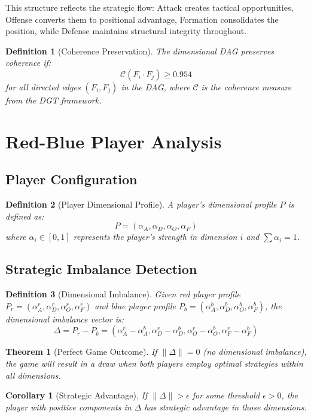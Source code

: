 \documentclass[12pt,a4paper]{article}
\newtheorem{definition}{Definition}
\newtheorem{theorem}{Theorem}
\newtheorem{corollary}{Corollary}
\begin{document}
This structure reflects the strategic flow: Attack creates tactical opportunities, Offense converts them to positional advantage, Formation consolidates the position, while Defense maintains structural integrity throughout.

\begin{definition}[Coherence Preservation]
The dimensional DAG preserves coherence if:
$$\mathcal{C}(F_i \cdot F_j) \geq 0.954$$
for all directed edges $(F_i, F_j)$ in the DAG, where $\mathcal{C}$ is the coherence measure from the DGT framework.
\end{definition}

\section{Red-Blue Player Analysis}

\subsection{Player Configuration}

\begin{definition}[Player Dimensional Profile]
A player's dimensional profile $P$ is defined as:
$$P = (\alpha_A, \alpha_D, \alpha_O, \alpha_F)$$
where $\alpha_i \in [0,1]$ represents the player's strength in dimension $i$ and $\sum \alpha_i = 1$.
\end{definition}

\subsection{Strategic Imbalance Detection}

\begin{definition}[Dimensional Imbalance]
Given red player profile $P_r = (\alpha_A^r, \alpha_D^r, \alpha_O^r, \alpha_F^r)$ and blue player profile $P_b = (\alpha_A^b, \alpha_D^b, \alpha_O^b, \alpha_F^b)$, the dimensional imbalance vector is:
$$\Delta = P_r - P_b = (\alpha_A^r - \alpha_A^b, \alpha_D^r - \alpha_D^b, \alpha_O^r - \alpha_O^b, \alpha_F^r - \alpha_F^b)$$
\end{definition}

\begin{theorem}[Perfect Game Outcome]
If $\|\Delta\| = 0$ (no dimensional imbalance), the game will result in a draw when both players employ optimal strategies within all dimensions.
\end{theorem}

\begin{corollary}[Strategic Advantage]
If $\|\Delta\| > \epsilon$ for some threshold $\epsilon > 0$, the player with positive components in $\Delta$ has strategic advantage in those dimensions.
\end{corollary}
\end{document}
